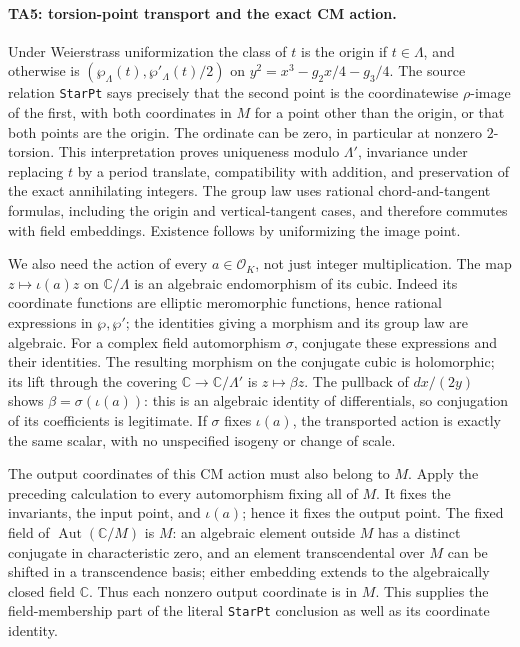 \paragraph{TA5: torsion-point transport and the exact CM action.}
Under Weierstrass uniformization the class of $t$ is the origin
if $t\in\Lambda$, and otherwise is
$(\wp_\Lambda(t),\wp'_\Lambda(t)/2)$ on
$y^2=x^3-g_2x/4-g_3/4$. The source relation \texttt{StarPt}
says precisely that the second point is the coordinatewise
$\rho$-image of the first, with both coordinates in $M$ for
a point other than the origin, or that both points are the origin.
The ordinate can be zero, in particular at nonzero $2$-torsion.
This interpretation
proves uniqueness modulo $\Lambda'$, invariance under replacing
$t$ by a period translate, compatibility with addition, and
preservation of the exact annihilating integers. The group law
uses rational chord-and-tangent formulas, including the origin
and vertical-tangent cases, and therefore commutes with field
embeddings. Existence follows by uniformizing the image point.

We also need the action of every $a\in\mathcal O_K$, not just
integer multiplication. The map $z\mapsto\iota(a)z$ on
$\mathbb C/\Lambda$ is an algebraic endomorphism of its cubic.
Indeed its coordinate functions are elliptic meromorphic
functions, hence rational expressions in $\wp,\wp'$; the
identities giving a morphism and its group law are algebraic.
For a complex field automorphism $\sigma$, conjugate these
expressions and their identities. The resulting morphism on
the conjugate cubic is holomorphic; its lift through the
covering $\mathbb C\to\mathbb C/\Lambda'$ is $z\mapsto\beta z$.
The pullback of $dx/(2y)$ shows
$\beta=\sigma(\iota(a))$: this is an algebraic identity of
differentials, so conjugation of its coefficients is legitimate.
If $\sigma$ fixes $\iota(a)$, the transported action is exactly
the same scalar, with no unspecified isogeny or change of scale.

The output coordinates of this CM action must also belong to
$M$. Apply the preceding calculation to every automorphism
fixing all of $M$. It fixes the invariants, the input point,
and $\iota(a)$; hence it fixes the output point. The fixed
field of $\operatorname{Aut}(\mathbb C/M)$ is $M$: an algebraic
element outside $M$ has a distinct conjugate in characteristic
zero, and an element transcendental over $M$ can be shifted
in a transcendence basis; either embedding extends to the
algebraically closed field $\mathbb C$. Thus each nonzero
output coordinate is in $M$. This supplies the field-membership
part of the literal \texttt{StarPt} conclusion as well as its
coordinate identity.

